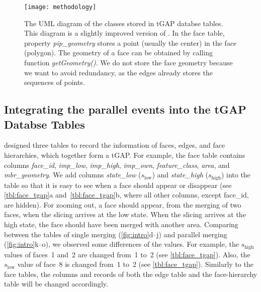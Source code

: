 \documentclass[]{interact}
\begin{document}
\begin{figure}[tb]
\centering
\texttt{[image: methodology]}
\caption{The UML diagram of the classes stored in tGAP databse tables.
This diagram is a slightly improved version of \citet[]{Meijers2011Thesis}.
In the face table, property \emph{pip\_geometry} 
stores a point (usually the center) in the face (polygon).
The geometry of a face can be obtained by calling function \emph{getGeometry()}.
We do not store the face geometry because we want to avoid redundancy,
as the edges already stores the sequences of points.
}
\label{fig:uml_tgap}
\end{figure}


\subsection{Integrating the parallel events into the tGAP Databse Tables}
\label{sec:integrate_tgap}

\citet[]{Meijers2011Thesis} designed three tables 
to record the information of
faces, edges, and face hierarchies, 
which together form a tGAP.
For example, the face table contains columns \emph{face\_id}, 
\emph{imp\_low}, \emph{imp\_high}, \emph{imp\_own},
\emph{feature\_class}, \emph{area}, and \emph{mbr\_geometry}.
We add columns \emph{state\_low} ($s_\mathrm{low}$) 
and \emph{state\_high} ($s_\mathrm{high}$) into the table 
so that it is easy to see when a face should appear or disappear 
(see \tabls\ref{tbl:face_tgap}a and~\ref{tbl:face_tgap}b,
where all other columns, except face\_id, are hidden).
For zooming out, a face should appear, 
from the merging of two faces,
when the slicing arrives at the low state.
When the slicing arrives at the high state,
the face should have been merged with another area.
Comparing between the tables of single merging 
(\figs\ref{fig:intro}d--j)
and parallel merging (\figs\ref{fig:intro}k--o),
we observed some differences of the values.
For example, the $s_\mathrm{high}$ values of faces~1 and~2 are changed from~1 to~2
(see \tabl\ref{tbl:face_tgap}).
Also, the $s_\mathrm{low}$ value of face~8 is changed from~1 to~2
(see \tabl\ref{tbl:face_tgap}).
Similarly to the face tables, 
the columns and records of both the edge table and the face-hierarchy table 
will be changed accordingly.
\end{document}
